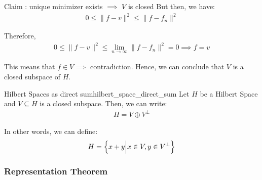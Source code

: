 \begin{proof*}
\begin{subproof}{\newline Claim : unique minimizer exists $\implies$ $V$ is closed}
        \noindent But then, we have:
        \begin{align*}
            0 \le \|f - v\|^2 \le \|f - f_n\|^2
        \end{align*}

        \noindent Therefore,
        \begin{align*}
            0 \le \|f - v\|^2 \le \lim_{n\to\infty} \|f - f_n\|^2 = 0 \implies f = v
        \end{align*}

        \noindent This means that $f \in V \implies$ contradiction. Hence, we can conclude that $V$ is a closed subspace of $H$.
    \end{subproof}
\end{proof*}

\begin{corollary}{Hilbert Spaces as direct sum}{hilbert_space_direct_sum}
    Let $H$ be a Hilbert Space and $V\subseteq H$ is a closed subspace. Then, we can write:
    \begin{align*}
        H = V \oplus V^\perp
    \end{align*}

    \noindent In other words, we can define:
    \begin{align*}
        H = \Big\{ 
            x + y \Big| x\in V, y \in V^\perp 
         \Big\}
    \end{align*}
\end{corollary}

\begin{proof*}
    
\end{proof*}


\subsubsection{Representation Theorem}
